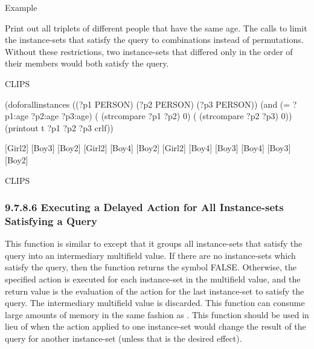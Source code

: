 \documentclass[letterpaper,10pt,english]{sphinxmanual}
\begin{document}

\begin{sphinxVerbatim}[commandchars=\\\{\}]
   
\end{sphinxVerbatim}

Example

Print out all triplets of different people that have the same age. The
calls to  limit the instance-sets that satisfy the query
to combinations instead of permutations. Without these restrictions, two
instance-sets that differed only in the order of their members would
both satisfy the query.

\begin{sphinxVerbatim}[commandchars=\\\{\}]
CLIPS\PYGZgt{}

    (do\PYGZhy{}for\PYGZhy{}all\PYGZhy{}instances ((?p1 PERSON) (?p2 PERSON) (?p3 PERSON))
      (and (= ?p1:age ?p2:age ?p3:age)
      (\PYGZgt{} (str\PYGZhy{}compare ?p1 ?p2) 0)
      (\PYGZgt{} (str\PYGZhy{}compare ?p2 ?p3) 0))
      (printout t ?p1 \PYGZdq{} \PYGZdq{} ?p2 \PYGZdq{} \PYGZdq{} ?p3 crlf))

    [Girl\PYGZhy{}2] [Boy\PYGZhy{}3] [Boy\PYGZhy{}2]
    [Girl\PYGZhy{}2] [Boy\PYGZhy{}4] [Boy\PYGZhy{}2]
    [Girl\PYGZhy{}2] [Boy\PYGZhy{}4] [Boy\PYGZhy{}3]
    [Boy\PYGZhy{}4] [Boy\PYGZhy{}3] [Boy\PYGZhy{}2]

    CLIPS\PYGZgt{}
\end{sphinxVerbatim}


\subsubsection{9.7.8.6 Executing a Delayed Action for All Instance-sets Satisfying a Query}
\label{\detokenize{cool:executing-a-delayed-action-for-all-instance-sets-satisfying-a-query}}
This function is similar to  except that it
groups all instance-sets that satisfy the query into an intermediary
multifield value. If there are no instance-sets which satisfy the query,
then the function returns the symbol FALSE. Otherwise, the specified
action is executed for each instance-set in the multifield value, and
the return value is the evaluation of the action for the last
instance-set to satisfy the query. The intermediary multifield value is
discarded. This function can consume large amounts of memory in the same
fashion as . This function should be used in lieu
of  when the action applied to one instance-set
would change the result of the query for another instance-set (unless
that is the desired effect).
\end{document}
